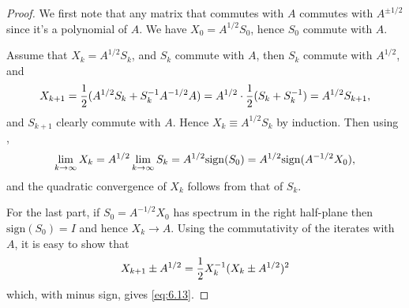 \documentclass{article}
\newcommand{\sign}{\mathrm{sign}}
\begin{document}
\begin{proof}
  We first note that any matrix that commutes with $A$ commutes with
  $A^{\pm 1/2}$ since it's a polynomial of $A$. We have $X_0 = A^{1/2}S_0$,
  hence $S_0$ commute with $A$.

  Assume that $X_k = A^{1/2}S_k$, and $S_k$ commute with $A$, then $S_k$
  commute with $A^{1/2}$, and
  \begin{equation}
    \notag
    X_{k + 1} = \frac{1}{2}(A^{1/2}S_k + S_k^{-1} A^{-1/2}A) = A^{1/2} \cdot
    \frac{1}{2}(S_k + S_k ^{-1}) = A^{1/2}S_{k+1},
  \end{equation}
  and $S_{k + 1}$ clearly commute with $A$. Hence $X_k \equiv A^{1/2}S_k$
  by induction. Then using ,
  \begin{equation}
    \notag
    \lim_{k \to \infty}X_k = A^{1/2}\lim_{k \to \infty}S_k =
    A^{1/2}\sign(S_0) = A^{1/2}\sign(A^{-1/2}X_{0}), 
  \end{equation}
  and the quadratic convergence of $X_k$ follows from that of $S_k$.

  For the last part, if $S_0 = A^{-1/2}X_0$ has spectrum in the right
  half-plane then $\sign(S_0) = I$ and hence $X_k \to A$. Using the
  commutativity of the iterates with $A$, it is easy to show that 
  \begin{equation}\label{eq:6.14}
    X_{k + 1} \pm A^{1/2} = \frac{1}{2}X_k^{-1} (X_k \pm A^{1/2})^2
  \end{equation}
  which, with minus sign, gives \eqref{eq:6.13}.
\end{proof}
\end{document}
